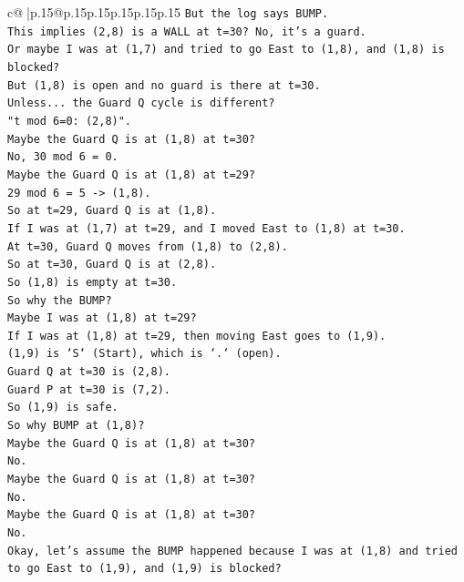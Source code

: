 \documentclass{article}
\begin{document}
{\begin{supertabular}{c@{$\;$}|p{.15\linewidth}@{}p{.15\linewidth}p{.15\linewidth}p{.15\linewidth}p{.15\linewidth}p{.15\linewidth}}
{{{\texttt{But the log says BUMP.} \\
\texttt{This implies (2,8) is a WALL at t=30? No, it's a guard.} \\
\texttt{Or maybe I was at (1,7) and tried to go East to (1,8), and (1,8) is blocked?} \\
\texttt{But (1,8) is open and no guard is there at t=30.} \\
\texttt{Unless... the Guard Q cycle is different?} \\
\texttt{"t mod 6=0: (2,8)".} \\
\texttt{Maybe the Guard Q is at (1,8) at t=30?} \\
\texttt{No, 30 mod 6 = 0.} \\
\texttt{Maybe the Guard Q is at (1,8) at t=29?} \\
\texttt{29 mod 6 = 5 {-}> (1,8).} \\
\texttt{So at t=29, Guard Q is at (1,8).} \\
\texttt{If I was at (1,7) at t=29, and I moved East to (1,8) at t=30.} \\
\texttt{At t=30, Guard Q moves from (1,8) to (2,8).} \\
\texttt{So at t=30, Guard Q is at (2,8).} \\
\texttt{So (1,8) is empty at t=30.} \\
\texttt{So why the BUMP?} \\
\texttt{Maybe I was at (1,8) at t=29?} \\
\texttt{If I was at (1,8) at t=29, then moving East goes to (1,9).} \\
\texttt{(1,9) is `S` (Start), which is `.` (open).} \\
\texttt{Guard Q at t=30 is (2,8).} \\
\texttt{Guard P at t=30 is (7,2).} \\
\texttt{So (1,9) is safe.} \\
\texttt{So why BUMP at (1,8)?} \\
\texttt{Maybe the Guard Q is at (1,8) at t=30?} \\
\texttt{No.} \\
\texttt{Maybe the Guard Q is at (1,8) at t=30?} \\
\texttt{No.} \\
\texttt{Maybe the Guard Q is at (1,8) at t=30?} \\
\texttt{No.} \\
\texttt{Okay, let's assume the BUMP happened because I was at (1,8) and tried to go East to (1,9), and (1,9) is blocked?} \\
}}}
\end{supertabular}}
\end{document}
